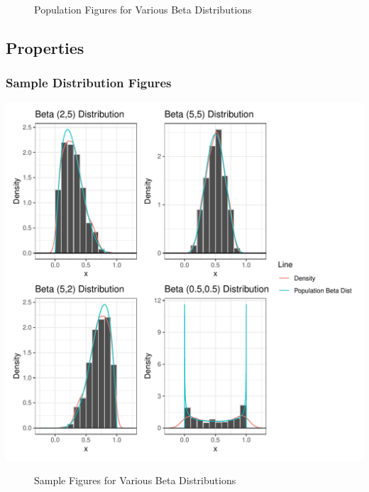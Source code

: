 \documentclass{article}\usepackage[]{graphicx}\usepackage[]{xcolor}
\makeatletter
\def\maxwidth{ %
  \ifdim\Gin@nat@width>\linewidth
    \linewidth
  \else
    \Gin@nat@width
  \fi
}
\newenvironment{knitrout}{}{} %
\makeatother
\begin{document}
\begin{figure}[H]
\begin{center}

\caption{Population Figures for Various Beta Distributions}
\label{populationfigures} %
\end{center}
\end{figure}

\pagebreak
\subsection{Properties}
\subsubsection{Sample Distribution Figures}
\begin{knitrout}\scriptsize
{}\color{fgcolor}
\includegraphics[width=\maxwidth]{figure/plot2-1} 
\end{knitrout}

\begin{figure}[H]
\begin{center}

\caption{Sample Figures for Various Beta Distributions}
\label{samplehistograms} %
\end{center}
\end{figure}
\end{document}
